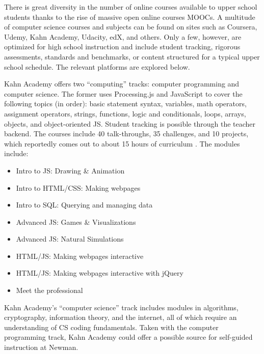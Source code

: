 There is great diversity in the number of online courses available to upper school students thanks to the rise of massive open online courses MOOCs. A multitude of computer science courses and subjects can be found on sites such as Coursera, Udemy, Kahn Academy, Udacity, edX, and others. Only a few, however, are optimized for high school instruction and include student tracking, rigorous assessments, standards and benchmarks, or content structured for a typical upper school schedule. The relevant platforms are explored below. \par
{} 
Kahn Academy offers two ``computing'' tracks: computer programming and computer science. The former uses Processing.js and JavaScript to cover the following topics (in order): basic statement syntax, variables, math operators, assignment operators, strings, functions, logic and conditionals, loops, arrays, objects, and object-oriented JS. Student tracking is possible through the teacher backend. The courses include 40 talk-throughs, 35 challenges, and 10 projects, which reportedly comes out to about 15 hours of curriculum \cite{kahnresource}.  The modules include:
\begin{itemize}
	\item Intro to JS: Drawing \& Animation
	\item Intro to HTML/CSS: Making webpages
	\item Intro to SQL: Querying and managing data
	\item Advanced JS: Games \& Visualizations
	\item Advanced JS: Natural Simulations
	\item HTML/JS: Making webpages interactive
	\item HTML/JS: Making webpages interactive with jQuery
	\item Meet the professional
\end{itemize}
Kahn Academy's ``computer science'' track includes modules in algorithms, cryptography, information theory, and the internet, all of which require an understanding of CS coding fundamentals. Taken with the computer programming track, Kahn Academy could offer a possible source for self-guided instruction at Newman. \par


